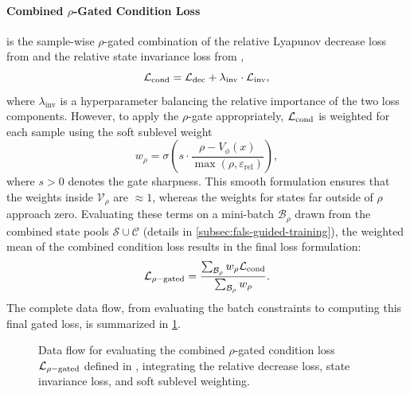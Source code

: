 \paragraph{Combined $\rho$-Gated Condition Loss} is the sample-wise $\rho$-gated combination of 
the relative Lyapunov decrease loss from  and 
the relative state invariance loss from ,
\begin{equation}
    \label{eq:combined-condition-violation}
    \mathcal{L}_{\mathrm{cond}} = 
        \mathcal{L}_{\mathrm{dec}} + 
        \lambda_{\mathrm{inv}} \cdot \mathcal{L}_{\mathrm{inv}},
\end{equation}
where $\lambda_{\mathrm{inv}}$ is a hyperparameter balancing the relative importance of the two loss components.
However, to apply the $\rho$-gate appropriately, $\mathcal{L}_{\mathrm{cond}}$ is weighted for each sample using the soft sublevel weight
\begin{equation}
    \label{eq:rho-gate}
    w_{\rho} = \sigma \left(
        s \cdot \frac{\rho - V_\phi(x)}{\max (\rho, \varepsilon_{\mathrm{rel}})}
    \right),
\end{equation}
where $s > 0$ denotes the gate sharpness. This smooth formulation ensures that the weights 
inside $\mathcal{V}_\rho$ are $\approx 1$, whereas the weights for states far outside of $\rho$ approach zero. 
Evaluating these terms on a mini-batch $\mathcal{B}_{\rho}$ drawn from the combined state pools 
$\mathcal{S} \cup \mathcal{C}$ (details in \cref{subsec:fals-guided-training}), 
the weighted mean of the combined condition loss results in the final loss formulation:
\begin{equation}
    \label{eq:rho-gated-condition-loss}
    \mathcal{L}_{\rho\mathrm{-gated}} = \frac{
        \sum_{\mathcal{B}_{\rho}} w_{\rho} \mathcal{L}_{\mathrm{cond}}
    }{
        \sum_{\mathcal{B}_{\rho}} w_{\rho}
    }.
\end{equation}
The complete data flow, from evaluating the batch constraints to computing 
this final gated loss, is summarized in \cref{fig:rho-gated-loss}. 

\begin{figure}[htbp]
    \centering
    
    \caption[Data flow of the gated condition loss]{
        Data flow for evaluating the combined $\rho$-gated condition loss $\mathcal{L}_{\rho\mathrm{-gated}}$ 
        defined in , integrating the relative decrease loss, 
        state invariance loss, and soft sublevel weighting.}
    \label{fig:rho-gated-loss}
\end{figure}




